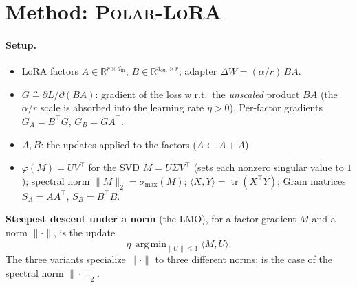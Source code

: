 \documentclass[11pt]{article}
\newcommand{\R}{\mathbb{R}}
\DeclareMathOperator*{\argmin}{arg\,min}
\newcommand{\smax}{\sigma_{\max}}
\newcommand{\DW}{\Delta W}
\newcommand{\polar}{\varphi}                 %
\newcommand{\methodname}{\textsc{Polar-LoRA}\xspace}
\theoremstyle{plain}
\theoremstyle{definition}
\theoremstyle{remark}
\begin{document}
\section{Method: \methodname}
\label{sec:method}

\paragraph{Setup.}
\begin{itemize}[leftmargin=1.5em,itemsep=1pt,topsep=2pt]
  \item LoRA factors $A\in\R^{r\times d_{\mathrm{in}}}$, $B\in\R^{d_{\mathrm{out}}\times r}$; adapter $\DW=(\alpha/r)\,BA$.
  \item $G\triangleq\partial L/\partial(BA)$: gradient of the loss w.r.t.\ the \emph{unscaled} product $BA$ (the $\alpha/r$ scale is absorbed into the learning rate $\eta>0$). Per-factor gradients $G_A=B^\top G$, $G_B=GA^\top$.
  \item $\dot A,\dot B$: the updates applied to the factors ($A\leftarrow A+\dot A$).
  \item $\polar(M)=UV^\top$ for the SVD $M=U\Sigma V^\top$ (sets each nonzero singular value to $1$); spectral norm $\|M\|_2=\smax(M)$; $\langle X,Y\rangle=\operatorname{tr}(X^\top Y)$; Gram matrices $S_A=AA^\top$, $S_B=B^\top B$.
\end{itemize}
\textbf{Steepest descent under a norm} (the LMO), for a factor gradient $M$ and a norm $\|\cdot\|$, is the update
\begin{equation}
  \eta\,\argmin_{\|U\|\le1}\langle M,U\rangle .
  \label{eq:lmo}
\end{equation}
The three variants specialize $\|\cdot\|$ to three different norms;  is the case of the spectral norm $\|\cdot\|_2$.
\end{document}
